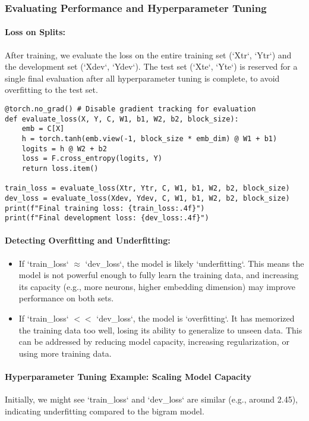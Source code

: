 \subsubsection{Evaluating Performance and Hyperparameter Tuning}

\paragraph{Loss on Splits:}
After training, we evaluate the loss on the entire training set (`Xtr`, `Ytr`) and the development set (`Xdev`, `Ydev`). The test set (`Xte`, `Yte`) is reserved for a single final evaluation after all hyperparameter tuning is complete, to avoid overfitting to the test set.

\begin{lstlisting}[caption=Evaluating Loss on Data Splits]
@torch.no_grad() # Disable gradient tracking for evaluation
def evaluate_loss(X, Y, C, W1, b1, W2, b2, block_size):
    emb = C[X]
    h = torch.tanh(emb.view(-1, block_size * emb_dim) @ W1 + b1)
    logits = h @ W2 + b2
    loss = F.cross_entropy(logits, Y)
    return loss.item()

train_loss = evaluate_loss(Xtr, Ytr, C, W1, b1, W2, b2, block_size)
dev_loss = evaluate_loss(Xdev, Ydev, C, W1, b1, W2, b2, block_size)
print(f"Final training loss: {train_loss:.4f}")
print(f"Final development loss: {dev_loss:.4f}")
\end{lstlisting}

\paragraph{Detecting Overfitting and Underfitting:}
\begin{itemize}
    \item If `train_loss` $\approx$ `dev_loss`, the model is likely `underfitting`. This means the model is not powerful enough to fully learn the training data, and increasing its capacity (e.g., more neurons, higher embedding dimension) may improve performance on both sets.
    \item If `train_loss` $<<$ `dev_loss`, the model is `overfitting`. It has memorized the training data too well, losing its ability to generalize to unseen data. This can be addressed by reducing model capacity, increasing regularization, or using more training data.
\end{itemize}

\paragraph{Hyperparameter Tuning Example: Scaling Model Capacity}
Initially, we might see `train_loss` and `dev_loss` are similar (e.g., around 2.45), indicating underfitting compared to the bigram model.

